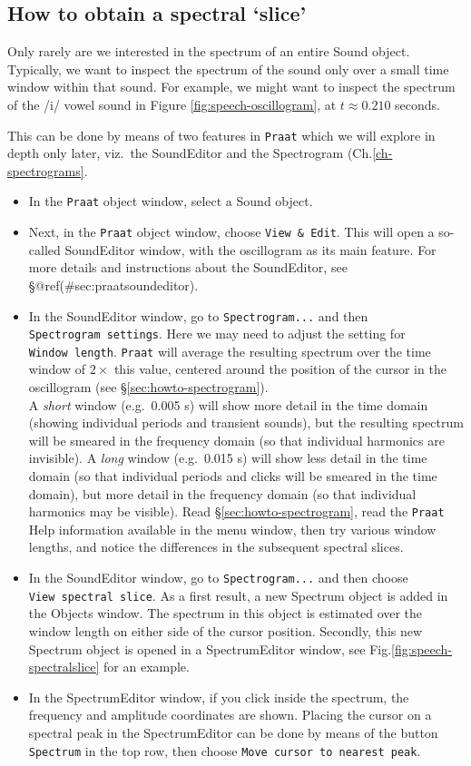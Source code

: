 \documentclass[
]{book}
\begin{document}
\label{box-praatspectralslice}
\subsection{How to obtain a spectral `slice'}\label{sec:spectralslice}

Only rarely are we interested in the spectrum of an entire Sound object. Typically, we want to inspect the spectrum of the sound only over a small time window within that sound. For example, we might want to inspect the spectrum of the /i/ vowel sound in Figure \ref{fig:speech-oscillogram}, at \(t \approx 0.210\) seconds.

This can be done by means of two features in \texttt{Praat} which we will explore in depth only later, viz.~the SoundEditor and the Spectrogram (Ch.\ref{ch-spectrograms}.

\begin{itemize}
\item
  In the \texttt{Praat} object window, select a Sound object.
\item
  Next, in the \texttt{Praat} object window, choose \texttt{View\ \&\ Edit}. This will open a so-called SoundEditor window, with the oscillogram as its main feature. For more details and instructions about the SoundEditor, see §@ref(\#sec:praatsoundeditor).
\item
  In the SoundEditor window, go to \texttt{Spectrogram...} and then \texttt{Spectrogram\ settings}. Here we may need to adjust the setting for \texttt{Window\ length}. \texttt{Praat} will average the resulting spectrum over the time window of \(2\times\) this value, centered around the position of the cursor in the oscillogram (see §\ref{sec:howto-spectrogram}).\\
  A \emph{short} window (e.g.~0.005 s) will show more detail in the time domain (showing individual periods and transient sounds), but the resulting spectrum will be smeared in the frequency domain (so that individual harmonics are invisible). A \emph{long} window (e.g.~0.015 s) will show less detail in the time domain (so that individual periods and clicks will be smeared in the time domain), but more detail in the frequency domain (so that individual harmonics may be visible). Read §\ref{sec:howto-spectrogram}, read the \texttt{Praat} Help information available in the menu window, then try various window lengths, and notice the differences in the subsequent spectral slices.
\item
  In the SoundEditor window, go to \texttt{Spectrogram...} and then choose \texttt{View\ spectral\ slice}. As a first result, a new Spectrum object is added in the Objects window. The spectrum in this object is estimated over the window length on either side of the cursor position. Secondly, this new Spectrum object is opened in a SpectrumEditor window, see Fig.\ref{fig:speech-spectralslice} for an example.
\item
  In the SpectrumEditor window, if you click inside the spectrum, the frequency and amplitude coordinates are shown. Placing the cursor on a spectral peak in the SpectrumEditor can be done by means of the button \texttt{Spectrum} in the top row, then choose \texttt{Move\ cursor\ to\ nearest\ peak}.
\end{itemize}
\end{document}
